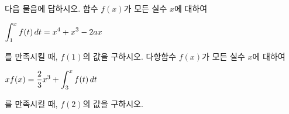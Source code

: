 다음 물음에 답하시오.
 함수 $f(x)$가 모든 실수 $x$에 대하여 \par\smallskip\centerline{$\displaystyle\int_{1}^{x}f(t)\mkern3mu dt=x^4+x^3-2ax$}\par\smallskip\noindent 를 만족시킬 때, $f(1)$의 값을 구하시오. 
 다항함수 $f(x)$가 모든 실수 $x$에 대하여 \par\smallskip\centerline{$xf(x)=\dfrac{2}{3}x^3+\displaystyle\int_{3}^{x}f(t)\mkern3mu dt$}\par\smallskip\noindent 를 만족시킬 때, $f(2)$의 값을 구하시오.
